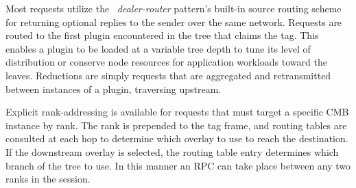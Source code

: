 Most requests utilize the \zMQ\ {\em dealer-router} pattern's built-in source routing
scheme for returning optional replies to the sender over the same network.
Requests are routed to the first plugin encountered in the tree that claims
the tag. %
This enables a plugin
to be loaded at a variable tree depth to tune its level of distribution
or conserve node resources for application workloads toward the leaves.
Reductions are simply requests that are aggregated and retransmitted between
instances of a plugin, traversing upstream.

Explicit rank-addressing is available for requests that must target a
specific CMB instance by rank. The rank is prepended to the tag frame,
and routing tables are consulted at each hop to determine which overlay
to use to reach the destination. If the downstream overlay is selected,
the routing table entry determines which branch of the tree to use.
In this manner an RPC can take place between any two ranks in the session.

%
